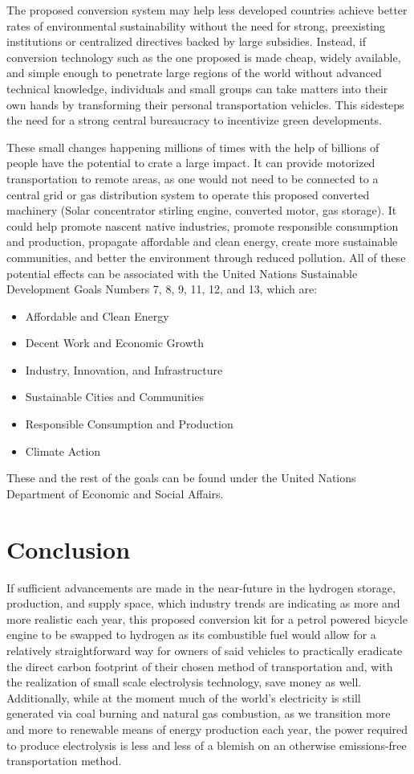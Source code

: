 \documentclass[conf]{new-aiaa}
\begin{document}
The proposed conversion system may help less developed countries achieve better rates of environmental sustainability without the need for strong, preexisting institutions or centralized directives backed by large subsidies. Instead, if conversion technology such as the one proposed is made cheap, widely available, and simple enough to penetrate large regions of the world without advanced technical knowledge, individuals and small groups can take matters into their own hands by transforming their personal transportation vehicles. This sidesteps the need for a strong central bureaucracy to incentivize green developments.

These small changes happening millions of times with the help of billions of people have the potential to crate a large impact. It can provide motorized transportation to remote areas, as one would not need to be connected to a central grid or gas distribution system to operate this proposed converted machinery (Solar concentrator stirling engine, converted motor, gas storage). It could help promote nascent native industries, promote responsible consumption and production, propagate affordable and clean energy, create more sustainable communities, and better the environment through reduced pollution. All of these potential effects can be associated with the United Nations Sustainable Development Goals Numbers 7, 8, 9, 11, 12, and 13, which are:

\begin{itemize}
    \item Affordable and Clean Energy
    \item Decent Work and Economic Growth
    \item Industry, Innovation, and Infrastructure
    \item Sustainable Cities and Communities
    \item Responsible Consumption and Production
    \item Climate Action
\end{itemize}

These and the rest of the goals can be found under the United Nations Department of Economic and Social Affairs. \cite{un_sdg}

\section{Conclusion}
If sufficient advancements are made in the near-future in the hydrogen storage, production, and supply space, which industry trends are indicating as more and more realistic each year, this proposed conversion kit for a petrol powered bicycle engine to be swapped to hydrogen as its combustible fuel would allow for a relatively straightforward way for owners of said vehicles to practically eradicate the direct carbon footprint of their chosen method of transportation and, with the realization of small scale electrolysis technology, save money as well.  Additionally, while at the moment much of the world's electricity is still generated via coal burning and natural gas combustion, as we transition more and more to renewable means of energy production each year, the power required to produce electrolysis is less and less of a blemish on an otherwise emissions-free transportation method.
\end{document}
